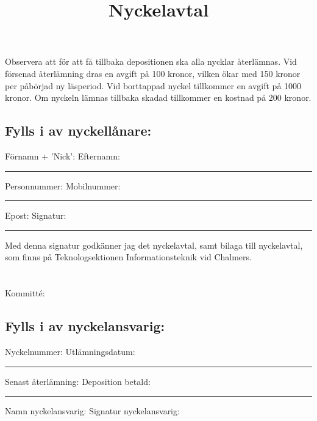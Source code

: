\documentclass[11pt, noincludeaddress, nopagination]{classes/cthit}
\begin{document}
\title{Nyckelavtal}

\makeheadfoot
\makesimpletitle
\vspace{-2 cm}
Observera att för att få tillbaka depositionen ska alla nycklar återlämnas. Vid försenad återlämning dras en avgift på 100 kronor, vilken ökar med 150 kronor per påbörjad ny läsperiod. Vid borttappad nyckel tillkommer en avgift på 1000 kronor.
Om nyckeln lämnas tillbaka skadad tillkommer en kostnad på 200 kronor.
\subsection*{Fylls i av nyckellånare:}

Förnamn + 'Nick': \hspace{4 cm}  Efternamn:
\vspace{0.8 cm}
~\\
\noindent\rule{\textwidth}{0.4pt}

Personnummer: \hspace{4.5 cm} Mobilnummer:
\vspace{0.8 cm}
~\\
\noindent\rule{\textwidth}{0.4pt}

Epost:  \hspace{6.1 cm} Signatur:
\vspace{0.8 cm}
~\\
\noindent\rule{\textwidth}{0.4pt}

Med denna signatur godkänner jag det nyckelavtal, samt bilaga till nyckelavtal, som finns på Teknologsektionen Informationsteknik vid Chalmers.\\\\\\
Kommitté:
\vspace{0.8 cm}

\subsection*{Fylls i av nyckelansvarig:}
Nyckelnummer: \hspace{4.7 cm}Utlämningsdatum:
\vspace{0.8 cm}~\\
\noindent\rule{\textwidth}{0.4pt}

Senast återlämning: \hspace{3.8 cm} Deposition betald:
\vspace{0.8 cm}~\\
\noindent\rule{\textwidth}{0.4pt}
Namn nyckelansvarig:  \hspace{3.5 cm} Signatur nyckelansvarig:
\end{document}
